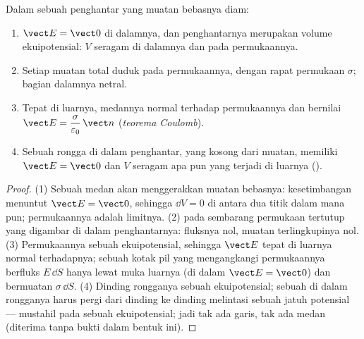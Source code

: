 \begin{theorem}\label{thm:b1:potential-capacitors:conductor}
Dalam sebuah penghantar yang muatan bebasnya diam:
\begin{enumerate}
  \item $\vect E = \vect 0$ di dalamnya, dan penghantarnya merupakan volume
        ekuipotensial: $V$ seragam di dalamnya dan pada permukaannya.
  \item Setiap muatan total duduk pada permukaannya, dengan rapat permukaan
        $\sigma$; bagian dalamnya netral.
  \item Tepat di luarnya, medannya normal terhadap permukaannya dan bernilai
        $\vect E = \dfrac{\sigma}{\varepsilon_0}\,\vect n$ (\emph{teorema Coulomb}).
  \item Sebuah rongga di dalam penghantar, yang kosong dari muatan, memiliki $\vect E =
        \vect 0$ dan $V$ seragam apa pun yang terjadi di luarnya (\emph{}).
\end{enumerate}
\end{theorem}

\begin{proof}
(1) Sebuah medan akan menggerakkan muatan bebasnya: kesetimbangan menuntut $\vect E =
\vect 0$, sehingga $\dd V = 0$ di antara dua titik dalam mana pun; permukaannya
adalah limitnya. (2)  pada sembarang permukaan tertutup yang
digambar di dalam penghantarnya: fluksnya nol, muatan terlingkupinya nol.
(3) Permukaannya sebuah ekuipotensial, sehingga $\vect E$ tepat di luarnya
normal terhadapnya; sebuah kotak pil yang mengangkangi permukaannya berfluks
$E\,\dd S$ hanya lewat muka luarnya (di dalam $\vect E = \vect 0$) dan bermuatan
$\sigma\,\dd S$. (4) Dinding rongganya sebuah ekuipotensial; sebuah 
di dalam rongganya harus pergi dari dinding ke dinding melintasi sebuah jatuh
potensial --- mustahil pada sebuah ekuipotensial; jadi tak ada garis, tak ada
medan (diterima tanpa bukti dalam bentuk ini).
\end{proof}

